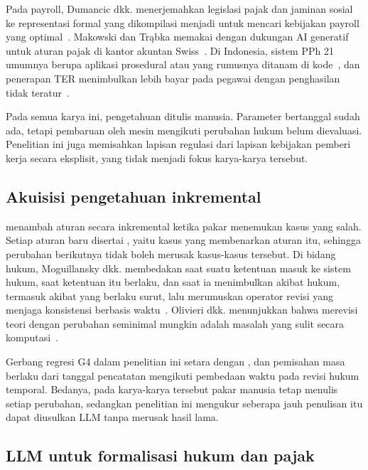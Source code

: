 Pada payroll, Dumancic dkk. menerjemahkan legislasi pajak dan jaminan sosial ke representasi formal yang dikompilasi menjadi  untuk mencari kebijakan payroll yang optimal~\cite{dumancic2021payroll}. Makowski dan Tr\k{a}bka memakai  dengan dukungan AI generatif untuk aturan pajak di kantor akuntan Swiss~\cite{makowski2025dmn}. Di Indonesia, sistem PPh 21 umumnya berupa aplikasi prosedural atau  yang rumusnya ditanam di kode~\cite{ramadhani2021grossup,yulistyawati2022payroll,kusuma2026pph21}, dan penerapan TER menimbulkan lebih bayar pada pegawai dengan penghasilan tidak teratur~\cite{sherra2025ter}.

Pada semua karya ini, pengetahuan ditulis manusia. Parameter bertanggal sudah ada, tetapi pembaruan  oleh mesin mengikuti perubahan hukum belum dievaluasi. Penelitian ini juga memisahkan lapisan regulasi dari lapisan kebijakan pemberi kerja secara eksplisit, yang tidak menjadi fokus karya-karya tersebut.

\subsection{Akuisisi pengetahuan inkremental}
\label{subsec:inkremental}

 menambah aturan secara inkremental ketika pakar menemukan kasus yang salah. Setiap aturan baru disertai , yaitu kasus yang membenarkan aturan itu, sehingga perubahan berikutnya tidak boleh merusak kasus-kasus tersebut. Di bidang hukum, Moguillansky dkk. membedakan saat suatu ketentuan masuk ke sistem hukum, saat ketentuan itu berlaku, dan saat ia menimbulkan akibat hukum, termasuk akibat yang berlaku surut, lalu merumuskan operator revisi yang menjaga konsistensi berbasis waktu~\cite{moguillansky2024temporalised}. Olivieri dkk. menunjukkan bahwa merevisi teori  dengan perubahan seminimal mungkin adalah masalah yang sulit secara komputasi~\cite{olivieri2025revising}.

Gerbang regresi G4 dalam penelitian ini setara dengan , dan pemisahan masa berlaku dari tanggal pencatatan mengikuti pembedaan waktu pada revisi hukum temporal. Bedanya, pada karya-karya tersebut pakar manusia tetap menulis setiap perubahan, sedangkan penelitian ini mengukur seberapa jauh penulisan itu dapat diusulkan LLM tanpa merusak hasil lama.

\subsection{LLM untuk formalisasi hukum dan pajak}
\label{subsec:llm-formal}


